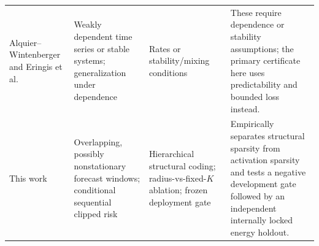 \begin{longtable}{
  >{\RaggedRight\arraybackslash}p{2.05cm}
  >{\RaggedRight\arraybackslash}p{3.35cm}
  >{\RaggedRight\arraybackslash}p{2.35cm}
  >{\RaggedRight\arraybackslash}p{5.05cm}
}
Alquier--Wintenberger \cite{alquier2012model} and Eringis et al. \cite{eringis2024dynamical} & Weakly dependent time series or stable systems; generalization under dependence & Rates or stability/mixing conditions & These require dependence or stability assumptions; the primary certificate here uses predictability and bounded loss instead. \\
This work & Overlapping, possibly nonstationary forecast windows; conditional sequential clipped risk & Hierarchical structural coding; radius-vs-fixed-$K$ ablation; frozen deployment gate & Empirically separates structural sparsity from activation sparsity and tests a negative development gate followed by an independent internally locked energy holdout. \\
\end{longtable}
\endgroup
